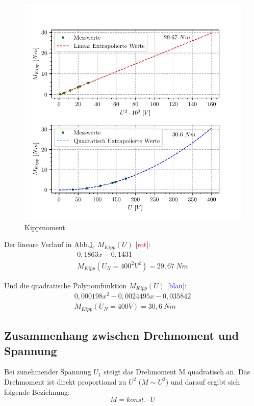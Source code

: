 \documentclass[conference]{IEEEtran}
\begin{document}
\vspace{-7ex}
\begin{figure}[htbp]
    \centering
    \includegraphics[width=\columnwidth]{./kippmoment.pdf}
    \caption{Kippmoment}
    \label{fig:Kippmoment}
\end{figure}

Der lineare Verlauf in Abb.\ref{fig:Kippmoment}, $M_{\textit{Kipp}}(U)$ [\textcolor{red}{rot}]:
\begin{gather*}
    0,1863 x - 0,1431\\
    M_{Kipp}(U_N=400^2V^2)=29,67 \ \si{Nm}
\end{gather*}

Und die quadratische Polynomfunktion $M_{\textit{Kipp}}(U)$ [\textcolor{blue}{blau}]:
\begin{gather*}
    0,000198 x^2 - 0,0024495 x -0,035842\\
    M_{Kipp}(U_N=400V)=30,6\ \si{Nm}
\end{gather*}



\subsection{Zusammenhang zwischen Drehmoment und Spannung}

Bei zunehmender Spannung $U_1$ steigt das Drehmoment M quadratisch an. Das
Drehmoment ist direkt proportional zu $U^2$ ($M \sim U^2$) und darauf ergibt sich
folgende Beziehnung: \[ M = \textit{konst.} \cdot U \]
\end{document}
